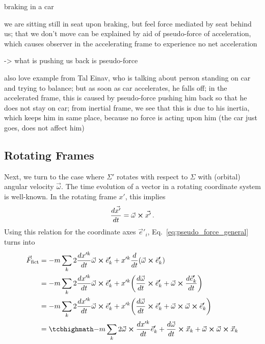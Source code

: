 \documentclass[../class_mech_main.tex]{subfiles}
\begin{document}
\begin{ex}[Braking]
	braking in a car

	we are sitting still in seat upon braking, but feel force mediated by seat behind us; that we don't move can be explained by aid of pseudo-force of acceleration, which causes observer in the accelerating frame to experience no net acceleration

	-> what is pushing us back is pseudo-force


	also love example from Tal Einav, who is talking about person standing on car and trying to balance; but as soon as car accelerates, he falls off; in the accelerated frame, this is caused by pseudo-force pushing him back so that he does not stay on car; from inertial frame, we see that this is due to his inertia, which keeps him in same place, because no force is acting upon him (the car just goes, does not affect him)
\end{ex}




        \subsection{Rotating Frames}
Next, we turn to the case where $\Sigma'$ rotates with respect to $\Sigma$ with (orbital) angular velocity $\vec{\omega}$. The time evolution of a vector in a rotating coordinate system is well-known.  In the rotating frame $x'$, this implies
\begin{equation}
    \dv{\vec{x'}}{t} = \vec{\omega} \cross \vec{x'} \, .
\end{equation}
Using this relation for the coordinate axes $\vec{e}'_i$, Eq.~\eqref{eq:pseudo_force_general} turns into
\begin{align}
	\vec{F}_\mathrm{fict}&= - m \sum_k 2 \dv{x'^k}{t} \vec{\omega} \cross \vec{e}'_k + x'^k \dv{t} \qty(\vec{\omega} \cross \vec{e}'_k)
	\notag\\
	&= - m \sum_k 2 \dv{x'^k}{t} \vec{\omega} \cross \vec{e}'_k + x'^k \qty(\dv{\vec{\omega}}{t} \cross \vec{e}'_k + \vec{\omega} \cross \dv{\vec{e}'_k}{t})
	\notag\\
	&= - m \sum_k 2 \dv{x'^k}{t} \vec{\omega} \cross \vec{e}'_k + x'^k \qty(\dv{\vec{\omega}}{t} \cross \vec{e}'_k + \vec{\omega} \cross \vec{\omega} \cross \vec{e}'_k)
	\notag\\
	&= \eqbox{
		- m \sum_k 2 \vec{\omega} \cross \dv{x'^k}{t} \vec{e}'_k + \dv{\vec{\omega}}{t} \cross \vec{x}_k + \vec{\omega} \cross \vec{\omega} \cross \vec{x}_k
	}
    \label{eq:pseudo_force_rot_frame}
\end{align}
\end{document}

